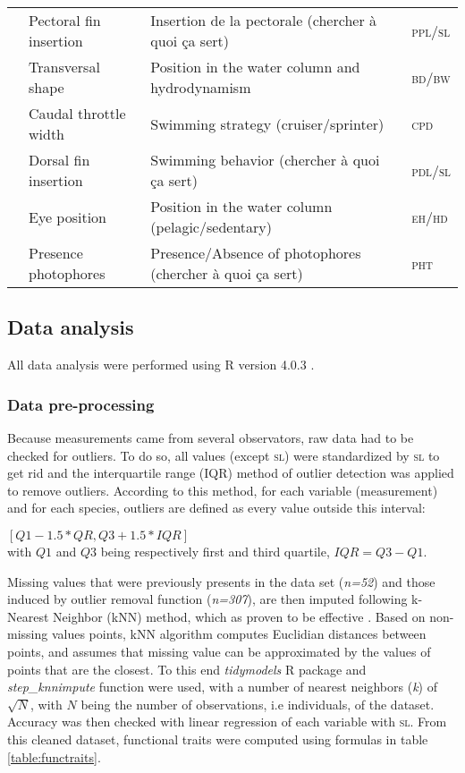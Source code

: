 \begin{sidewaystable}
\begin{tabular}{>{\bfseries}lll>{\scshape}l}
  &Pectoral fin insertion & Insertion de la pectorale (chercher à quoi ça sert) & ppl/sl \\ 
  &Transversal shape & Position in the water column and hydrodynamism & bd/bw \\ 
  &Caudal throttle width & Swimming strategy (cruiser/sprinter) & cpd \\ 
  &Dorsal fin insertion & Swimming behavior (chercher à quoi ça sert) & pdl/sl \\ 
  \hline
  \multirow{2}{*}{Habitat} &Eye position & Position in the water column (pelagic/sedentary) & eh/hd \\ 
  &Presence photophores & Presence/Absence of photophores (chercher à quoi ça sert) & pht \\ 
   \hline
\end{tabular}
\end{sidewaystable}

\subsection{Data analysis}
All data analysis were performed using \textsf{R} version 4.0.3 \citet{rcoreteam2021}.

\subsubsection{Data pre-processing}
Because measurements came from several observators, raw data had to be checked for outliers. To do so, all values (except \textsc{sl}) were standardized by \textsc{sl} to get rid and the interquartile range (IQR) method of outlier detection was applied to remove outliers. According to this method, for each variable (measurement) and for each species, outliers are defined as every value outside this interval: 
\begin{center}
$ [Q1 - 1.5*QR, Q3 + 1.5*IQR]$ \\
with $Q1$ and $Q3$ being respectively first and third quartile, $IQR = Q3 - Q1$. 
\end{center}{}


Missing values that were previously presents in the data set (\textit{n=52}) and those induced by outlier removal function (\textit{n=307}), are then imputed following k-Nearest Neighbor (kNN) method, which as proven to be effective \citep{zhang2012}. Based on non-missing values points, kNN algorithm computes Euclidian distances between points, and assumes that missing value can be approximated by the values of points that are the closest. To this end \emph{tidymodels} R package and \emph{step\_knnimpute} function \citep{kuhn2020} were used, with a number of nearest neighbors (\textit{k}) of $\sqrt{N}$, with $N$ being the number of observations, i.e individuals, of the dataset. Accuracy was then checked with linear regression of each variable with \textsc{sl}. From this cleaned dataset, functional traits were computed using formulas in table \ref{table:functraits}. 

